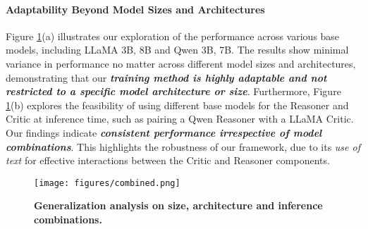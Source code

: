 \paragraph{Adaptability Beyond Model Sizes and Architectures} 
Figure \ref{fig:generalization}(a) illustrates our exploration of the performance across various base models, including LLaMA 3B, 8B and Qwen 3B, 7B. The results show minimal variance in performance no matter across different model sizes and architectures, demonstrating that our \textbf{\emph{training method is highly adaptable and not restricted to a specific model architecture or size}}. Furthermore, Figure \ref{fig:generalization}(b)  explores the feasibility of using different base models for the Reasoner and Critic at inference time, such as pairing a Qwen Reasoner with a LLaMA Critic. Our findings indicate  \textbf{\emph{consistent performance irrespective of model combinations}}. This highlights the robustness of our framework, due to its \emph{use of text} for effective interactions between the Critic and Reasoner components.
\begin{figure}[!h]
\centering
\vspace{-2mm}
\texttt{[image: figures/combined.png]}
\vspace{-2mm}
\caption{\small \textbf{Generalization analysis on size, architecture and inference combinations.}}
\label{fig:generalization}\vspace{-6mm}
\end{figure}











